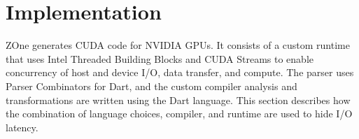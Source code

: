 \section{Implementation}

ZOne generates CUDA code for NVIDIA GPUs.
It consists of a custom
runtime that uses Intel Threaded Building Blocks and CUDA Streams to enable
concurrency of host and device I/O, data transfer, and compute. The parser
uses Parser Combinators for Dart\cite{dartparsers}, and the custom compiler
analysis and transformations are written using the Dart language.
This section describes how the combination of language choices, compiler, and runtime are used to hide I/O latency.





